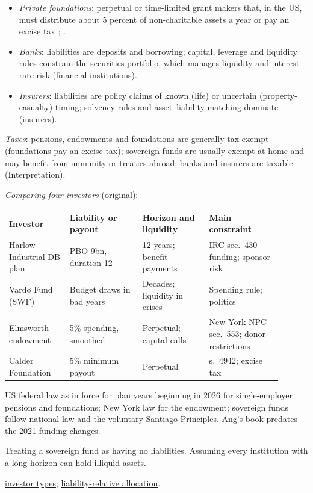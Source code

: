 \begin{qfdefinition}
\begin{itemize}
\item \emph{Private foundations}: perpetual or time-limited grant makers that, in the US, must distribute about 5 percent of non-charitable assets a year or pay an excise tax \citep[sec.~4942(e)]{us-internal-revenue-code-26}; \citep[p.~24]{s7-ang}.
\item \emph{Banks}: liabilities are deposits and borrowing; capital, leverage and liquidity rules constrain the securities portfolio, which manages liquidity and interest-rate risk (\hyperref[def:financial-institution-features]{financial institutions}).
\item \emph{Insurers}: liabilities are policy claims of known (life) or uncertain (property-casualty) timing; solvency rules and asset--liability matching dominate (\hyperref[meth:insurer-analysis]{insurers}).
\end{itemize}
\emph{Taxes}: pensions, endowments and foundations are generally tax-exempt (foundations pay an excise tax); sovereign funds are usually exempt at home and may benefit from immunity or treaties abroad; banks and insurers are taxable (Interpretation).

 \emph{Comparing four investors} (original):
\begin{center}\small
\begin{tabular}{@{}p{0.2\linewidth}p{0.24\linewidth}p{0.22\linewidth}p{0.24\linewidth}@{}}
\toprule
Investor & Liability or payout & Horizon and liquidity & Main constraint \\
\midrule
Harlow Industrial DB plan & PBO 9bn, duration 12 & 12 years; benefit payments & IRC sec.~430 funding; sponsor risk \\
Vardø Fund (SWF) & Budget draws in bad years & Decades; liquidity in crises & Spending rule; politics \\
Elmsworth endowment & 5\% spending, smoothed & Perpetual; capital calls & New York NPC sec.~553; donor restrictions \\
Calder Foundation & 5\% minimum payout & Perpetual & s.~4942; excise tax \\
\bottomrule
\end{tabular}
\end{center}

 US federal law as in force for plan years beginning in 2026 for single-employer pensions and foundations; New York law for the endowment; sovereign funds follow national law and the voluntary Santiago Principles. Ang's book predates the 2021 funding changes.

 Treating a sovereign fund as having no liabilities. Assuming every institution with a long horizon can hold illiquid assets.

 \hyperref[def:investor-types-needs]{investor types}; \hyperref[meth:liability-relative-allocation]{liability-relative allocation}.

\end{qfdefinition}


